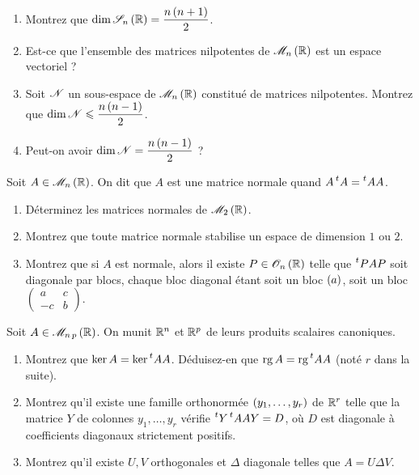 \begin{exo}~\\
\begin{enumerate}
    \item Montrez que \(\dim\sym{n}[\R]=\dfrac{n\paren{n+1}}{2}\). \\
    \item Est-ce que l'ensemble des matrices nilpotentes de \(\M{n}[\R]\) est un espace vectoriel ? \\
    \item Soit \(\mathscr{N}\) un sous-espace de \(\M{n}[\R]\) constitué de matrices nilpotentes. Montrez que \(\dim\mathscr{N}\leqslant\dfrac{n\left(n-1\right)}{2}\). \\
    \item Peut-on avoir \(\dim\mathscr{N}=\dfrac{n\left(n-1\right)}{2}\) ?
\end{enumerate}
\end{exo}

\begin{exo}
Soit \(A\in\M{n}[\R]\). On dit que \(A\) est une matrice normale quand \(A\prescript{t}{}{A}=\prescript{t}{}{A}A\).

\begin{enumerate}
    \item Déterminez les matrices normales de \(\M{2}[\R]\). \\
    \item Montrez que toute matrice normale stabilise un espace de dimension \(1\) ou \(2\). \\
    \item Montrez que si \(A\) est normale, alors il existe \(P\in\Orth{n}[\R]\) telle que \(\prescript{t}{}{P}AP\) soit diagonale par blocs, chaque bloc diagonal étant soit un bloc \(\left(a\right)\), soit un bloc \(\begin{pmatrix}
        a & c \\
        -c & b
    \end{pmatrix}\).
\end{enumerate}
\end{exo}

\begin{exo}
Soit \(A\in\M{n\,p}[\R]\). On munit \(\mathbb{R}^n\) et \(\mathbb{R}^p\) de leurs produits scalaires canoniques.

\begin{enumerate}
    \item Montrez que \(\ker A=\ker\prescript{t}{}{A}A\). Déduisez-en que \(\operatorname{rg} A=\operatorname{rg}\prescript{t}{}{A}A\) (noté \(r\) dans la suite). \\
    \item Montrez qu'il existe une famille orthonormée \(\left(y_1,\dots,y_r\right)\) de \(\mathbb{R}^r\) telle que la matrice \(Y\) de colonnes \(y_1,\dots,y_r\) vérifie \(\prescript{t}{}{Y}\prescript{t}{}{A}AY=D\), où \(D\) est diagonale à coefficients diagonaux strictement positifs. \\
    \item Montrez qu'il existe \(U,V\) orthogonales et \(\Delta\) diagonale telles que \(A=U\Delta V\).
\end{enumerate}
\end{exo}

